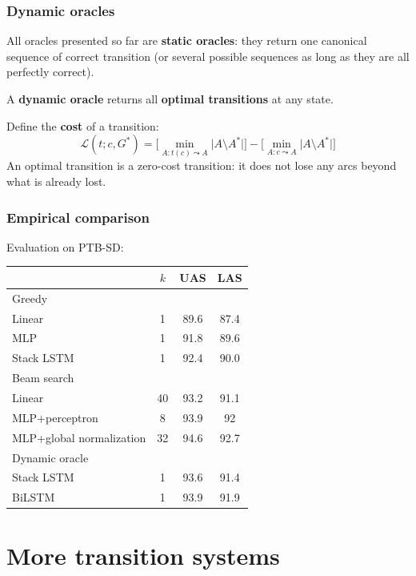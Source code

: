 \documentclass[t]{beamer}
\begin{document}
\begin{frame}
  \frametitle{Dynamic oracles \cite{goldberg2012dynamic}}
  All oracles presented so far are \textbf{static oracles}:
  they return one canonical sequence of correct transition
  (or several possible sequences as long as they are all perfectly correct).
  
  A \textbf{dynamic oracle} returns all \textbf{optimal transitions} at any state.
  
  \pause\vfill
  
  Define the \textbf{cost} of a transition:
  \[
  \mathcal{L}(t;c,G^*)=\Bigg[\min_{A:t(c)\leadsto A} \Big|A\setminus A^*\Big|\Bigg]-
  \Bigg[\min_{A:c\leadsto A} \Big|A\setminus A^*\Big|\Bigg]
  \]
  An optimal transition is a zero-cost transition:
  it does not lose any arcs beyond what is already lost.
\end{frame}

\begin{frame}
    \frametitle{Empirical comparison}
    Evaluation on PTB-SD:
    \begin{center}
    \begin{tabular}{l|c|cc}
    & $k$ & UAS & LAS \\ \hline
    Greedy \\
    Linear \cite{ZhangTDP11} & 1 & 89.6 & 87.4 \\
    MLP \cite{chen2014fast} & 1 & 91.8 & 89.6 \\
    Stack LSTM \cite{dyer2015transition} & 1 & 92.4 & 90.0 \\
    \hline
    Beam search \\
    Linear \cite{bohnet2012transition} & 40 & 93.2 & 91.1 \\
    MLP+perceptron \cite{weiss2015structured} & 8 & 93.9 & 92 \\
    MLP+global normalization \cite{andor2016globally} & 32 & 94.6 & 92.7 \\
    \hline
    Dynamic oracle \\
    Stack LSTM \cite{ballesteros-EtAl:2016:EMNLP2016} & 1 & 93.6 & 91.4 \\
    BiLSTM \cite{kiperwasser2016simple} & 1 & 93.9 & 91.9 \\
    \end{tabular}
    \end{center}
\end{frame}



\section{More transition systems}
\end{document}
